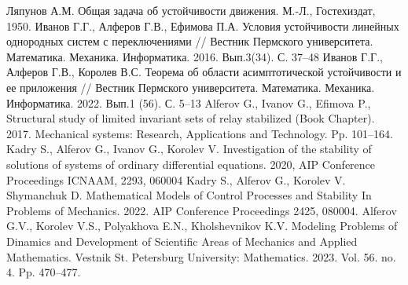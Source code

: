 \begin{thebibliography}{9} %
 Ляпунов А.М. Общая задача об устойчивости движения. М.-Л., Гостехиздат, 1950.
 Иванов Г.Г., Алферов Г.В., Ефимова П.А. Условия устойчивости линейных однородных систем с переключениями  //  Вестник Пермского университета. Математика. Механика. Информатика. 2016. Вып.3(34). С. 37--48
 Иванов Г.Г., Алферов Г.В., Королев В.С.  Теорема об области асимптотической устойчивости и ее приложения   // Вестник Пермского университета. Математика. Механика. Информатика. 2022. Вып.1 (56). С. 5--13
 Alferov G., Ivanov G., Efimova P., Structural study of limited invariant sets of relay stabilized (Book Chapter). 2017. Mechanical systems: Research, Applications and Technology. Pp. 101--164.
 Kadry S., Alferov G., Ivanov G., Korolev V. Investigation of the stability of solutions of systems of ordinary differential  equations.     2020, AIP Conference  Proceedings  ICNAAM,  2293, 060004
 Kadry S., Alferov G.,  Korolev V. Shymanchuk D. Mathematical  Models of Control  Processes and Stability In Problems of Mechanics. 2022. AIP Conference Proceedings 2425, 080004.
 Alferov G.V., Korolev V.S., Polyakhova E.N., Kholshevnikov K.V. Modeling Problems of Dinamics and Development of Scientific Areas of Mechanics and Applied Mathematics.  Vestnik St. Petersburg University: Mathematics. 2023. Vol. 56. no. 4. Pp. 470--477.
\end{thebibliography}





% 
